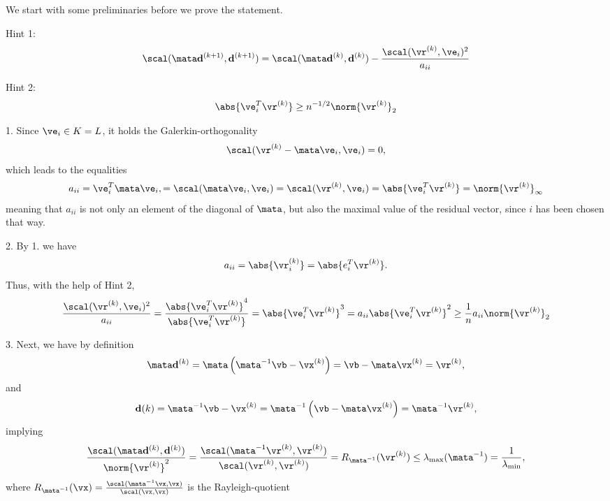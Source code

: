 \begin{SolutionSheet}[\ref{sheet8}]
\begin{Solution}
    
  \end{Solution}

  \begin{Solution}
    We start with some preliminaries before we prove the statement.

    Hint 1:
    \begin{gather*}
      \scal(\mata\vd^{(k+1)},\vd^{(k+1)})
      =\scal(\mata\vd^{(k)},\vd^{(k)})
      -\frac{\scal(\vr^{(k)},\ve_i)^2}{a_{ii}}
    \end{gather*}

    Hint 2:
    \begin{gather*}
      \abs{\ve_i^T \vr^{(k)}} \geq n^{-\nfrac12}\norm{\vr^{(k)}}_2
    \end{gather*}

    1. Since $\ve_i\in K=L$, it holds the Galerkin-orthogonality
    \begin{align*}
      \scal(\vr^{(k)}-\mata \ve_i,\ve_i) = 0,
    \end{align*}
    which leads to the equalities
    \begin{align*}
      a_{ii}
      = \ve_i^T\mata \ve_i,
      = \scal(\mata \ve_i,\ve_i)
      = \scal(\vr^{(k)},\ve_i)
      = \abs{\ve_i^T\vr^{(k)}}
      = \norm{\vr^{(k)}}_{\infty}
    \end{align*}
    meaning that $a_{ii}$ is not only an element of the diagonal of
    $\mata$, but also the maximal value of the residual vector, since
    $i$ has been chosen that way.

    2. By 1. we have
    \begin{align*}
      a_{ii} = \abs{\vr^{(k)}_i} = \abs{e_i^T \vr^{(k)}}.
    \end{align*}
    Thus, with the help of Hint 2,
    \begin{align*}
      \frac{\scal(\vr^{(k)},\ve_i)^2}{a_{ii}}
      = \frac{\abs{\ve_i^T\vr^{(k)}}^4}{\abs{\ve_i^T\vr^{(k)}}}
      = \abs{\ve_i^T\vr^{(k)}}^3
      = a_{ii} \abs{\ve_i^T\vr^{(k)}}^2
      \geq \frac1n a_{ii}\norm{\vr^{(k)}}_2
    \end{align*}

    3. Next, we have by definition
    \begin{align*}
      \mata\vd^{(k)}
      = \mata\left(\mata^{-1}\vb-\vx^{(k)}\right)
      = \vb-\mata\vx^{(k)}
      = \vr^{(k)},
    \end{align*}
    and
    \begin{align*}
      \vd{(k)}
      = \mata^{-1}\vb-\vx^{(k)}
      = \mata^{-1}\left(\vb-\mata\vx^{(k)} \right)
      = \mata^{-1} \vr^{(k)},
    \end{align*}
    implying
    \begin{align*}
      \frac{\scal(\mata\vd^{(k)},\vd^{(k)})}{\norm{\vr^{(k)}}^2}
      = \frac{\scal(\mata^{-1}\vr^{(k)},\vr^{(k)})}{\scal(\vr^{(k)},\vr^{(k)})}
      = R_{\mata^{-1}}(\vr^{(k)})
      \leq \lambda_{\max}(\mata^{-1})
      = \frac1{\lambda_{\min}},
    \end{align*}
    where
    $R_{\mata^{-1}}(\vx)=\frac{\scal(\mata^{-1}\vx,\vx)}{\scal(\vx,\vx)}$
    is the Rayleigh-quotient


\end{Solution}
\end{SolutionSheet}
